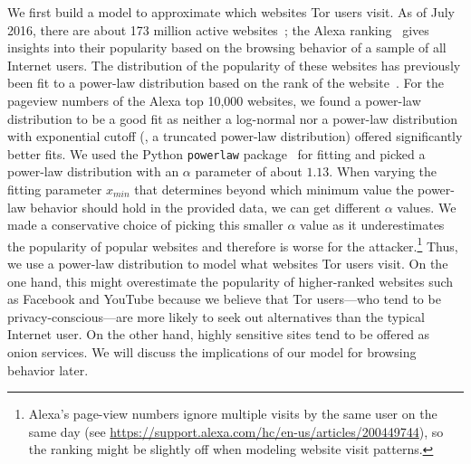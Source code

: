 We first build a model to approximate {which websites} Tor users visit.
As of July 2016, there are about 173 million active
websites~\cite{numberofwebsites}; the Alexa ranking~\cite{alexatop1k}
gives insights into their popularity based on the browsing behavior of
a sample of all Internet users. The distribution of the popularity of
these websites has previously been fit to a power-law distribution based
on the rank of the
website~\cite{Ali2007a,Clauset2009a,Mahanti2013a}.
For the pageview numbers of the Alexa top 10,000 websites, we found a
power-law distribution to be a good fit as neither a log-normal nor a
power-law distribution with exponential cutoff (\ie, a truncated power-law
distribution) offered significantly better fits.
We used the Python {\tt powerlaw} package~\cite{Alstott2014a} for fitting and
picked a power-law distribution with an $\alpha$ parameter of about $1.13$.
When varying the fitting parameter $x_{min}$ that determines beyond which
minimum value the power-law behavior should hold in the provided data, we can
get different $\alpha$ values. We made a conservative choice of picking this
smaller $\alpha$ value as it underestimates the popularity of popular websites
and therefore is worse for the attacker.\footnote{Alexa's page-view numbers
ignore multiple visits by the same user on the same day (see
\url{https://support.alexa.com/hc/en-us/articles/200449744}), so the ranking
might be slightly off when modeling website visit patterns.}
Thus, we use a power-law distribution to model what websites Tor users visit.
On the one hand, this might overestimate the popularity of higher-ranked
websites such as Facebook and YouTube because we believe that Tor users---who
tend to be privacy-conscious---are more likely to seek out alternatives than
the typical Internet user.
On the other hand, highly sensitive sites tend to be offered as onion services.
We will discuss the implications of our model for browsing
behavior later.

